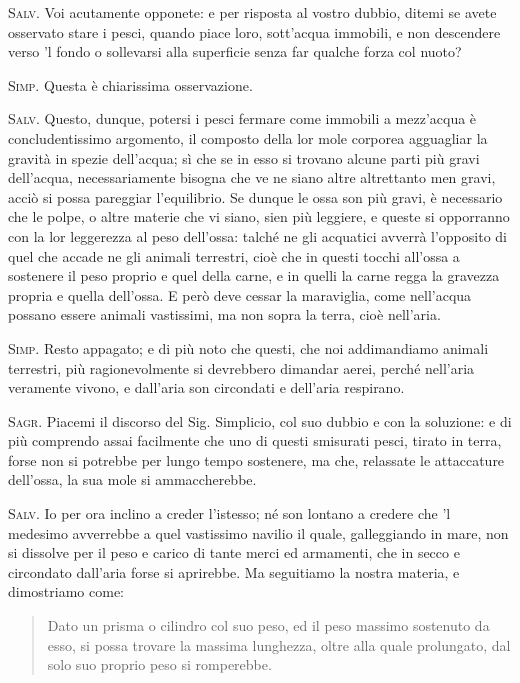 \documentclass[11pt,twoside,openany]{book}
\newcommand{\speaker}[1]{\textcolor{rubric}{\textsc{#1}}\space}
\newenvironment{enunciato}{%
  \begin{quote}\itshape%
}{%
  \end{quote}%
}
\begin{document}
\speaker{Salv.} Voi acutamente opponete: e per risposta al vostro dubbio, ditemi se avete osservato stare i pesci, quando piace loro, sott'acqua immobili, e non descendere verso 'l fondo o sollevarsi alla superficie senza far qualche forza col nuoto?

\speaker{Simp.} Questa è chiarissima osservazione.

\speaker{Salv.} Questo, dunque, potersi i pesci fermare come immobili a mezz'acqua è concludentissimo argomento, il composto della lor mole corporea agguagliar la gravità in spezie dell'acqua; sì che se in esso si trovano alcune parti più gravi dell'acqua, necessariamente bisogna che ve ne siano altre altrettanto men gravi, acciò si possa pareggiar l'equilibrio. Se dunque le ossa son più gravi, è necessario che le polpe, o altre materie che vi siano, sien più leggiere, e queste si opporranno con la lor leggerezza al peso dell'ossa: talché ne gli acquatici avverrà l'opposito di quel che accade ne gli animali terrestri, cioè che in questi tocchi all'ossa a sostenere il peso proprio e quel della carne, e in quelli la carne regga la gravezza propria e quella dell'ossa. E però deve cessar la maraviglia, come nell'acqua possano essere animali vastissimi, ma non sopra la terra, cioè nell'aria.

\speaker{Simp.} Resto appagato; e di più noto che questi, che noi addimandiamo animali terrestri, più ragionevolmente si devrebbero dimandar aerei, perché nell'aria veramente vivono, e dall'aria son circondati e dell'aria respirano.

\speaker{Sagr.} Piacemi il discorso del Sig. Simplicio, col suo dubbio e con la soluzione: e di più comprendo assai facilmente che uno di questi smisurati pesci, tirato in terra, forse non si potrebbe per lungo tempo sostenere, ma che, relassate le attaccature dell'ossa, la sua mole si ammaccherebbe.

\speaker{Salv.} Io per ora inclino a creder l'istesso; né son lontano a credere che 'l medesimo avverrebbe a quel vastissimo navilio il quale, galleggiando in mare, non si dissolve per il peso e carico di tante merci ed armamenti, che in secco e circondato dall'aria forse si aprirebbe. Ma seguitiamo la nostra materia, e dimostriamo come:


\begin{enunciato}
Dato un prisma o cilindro col suo peso, ed il peso massimo sostenuto da esso, si possa trovare la massima lunghezza, oltre alla quale prolungato, dal solo suo proprio peso si romperebbe.
\end{enunciato}
\end{document}
